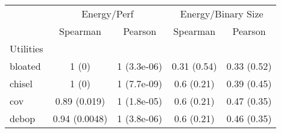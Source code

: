 \begin{tabular}{l|cc||cc}
\toprule
 & \multicolumn{2}{c}{Energy/Perf} & \multicolumn{2}{c}{Energy/Binary Size} \\
 & Spearman & Pearson & Spearman & Pearson \\
Utilities &  &  &  &  \\
\midrule
bloated & 1 (0) & 1 (3.3e-06) & 0.31 (0.54) & 0.33 (0.52) \\
chisel & 1 (0) & 1 (7.7e-09) & 0.6 (0.21) & 0.39 (0.45) \\
cov & 0.89 (0.019) & 1 (1.8e-05) & 0.6 (0.21) & 0.47 (0.35) \\
debop & 0.94 (0.0048) & 1 (3.8e-06) & 0.6 (0.21) & 0.46 (0.35) \\
\bottomrule
\end{tabular}
